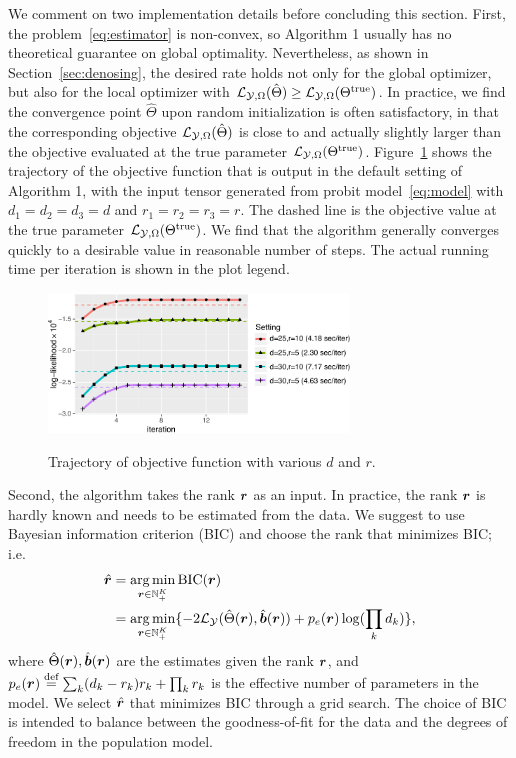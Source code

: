 \documentclass{article}
\theoremstyle{plain}
\theoremstyle{definition}
\begin{document}
We comment on two implementation details before concluding this section. First, the problem~\eqref{eq:estimator} is non-convex, so Algorithm 1 usually has no theoretical guarantee on global optimality. Nevertheless, as shown in Section~\ref{sec:denosing}, the desired rate holds not only for the global optimizer, but also for the local optimizer with $\mathcal{L}_{\mathcal{Y},\Omega}(\hat \Theta)\geq \mathcal{L}_{\mathcal{Y},\Omega}(\Theta^{\mathrm{true}})$. In practice, we find the convergence point $\hat \Theta$ upon random initialization is often satisfactory, in that the corresponding objective $\mathcal{L}_{\mathcal{Y},\Omega}(\hat \Theta)$ is close to and actually slightly larger than the objective evaluated at the true parameter $\mathcal{L}_{\mathcal{Y},\Omega}(\Theta^{\mathrm{true}})$. Figure~\ref{fig:stability} shows the trajectory of the objective function that is output in the default setting of Algorithm 1, with the input tensor generated from probit model~\eqref{eq:model} with $d_1=d_2=d_3=d$ and $r_1=r_2=r_3=r$. The dashed line is the objective value at the true parameter $\mathcal{L}_{\mathcal{Y},\Omega}(\Theta^{\mathrm{true}})$. We find that the algorithm generally converges quickly to a desirable value in reasonable number of steps. The actual running time per iteration is shown in the plot legend.

\begin{figure}[H]
\centering
\includegraphics[width=8cm]{algorithm.pdf}\label{fig:stability}
\vspace{-.2cm}
\caption{Trajectory of objective function with various $d$ and $r$.}
\vspace{-.2cm}
\end{figure}



Second, the algorithm takes the rank $\bm{r}$ as an input. In practice, the rank $\bm{r}$ is hardly known and needs to be estimated from the data. We suggest to use Bayesian information criterion (BIC) and choose the rank that minimizes BIC; i.e.
\begin{align}\label{eq:BIC}
\hat {\bm{r}}&=\operatorname*{arg\,min}_{\bm{r}\in\mathbb{N}^K_{+}} \text{BIC}(\bm{r})\\
&=\operatorname*{arg\,min}_{\bm{r}\in\mathbb{N}^K_{+}}\{-2\mathcal{L}_{\mathcal{Y}}(\hat \Theta(\bm{r}),\hat {\bm{b}}(\bm{r}))+p_e(\bm{r})\log (\prod_k d_k)\},
\end{align}
where $\hat \Theta(\bm{r}), \hat{\bm{b}}(\bm{r})$ are the estimates given the rank $\bm{r}$, and $p_e(\bm{r})\stackrel{\text{def}}{=}\sum_k (d_k-r_k)r_k+\prod_k r_k$ is the effective number of parameters in the model. We select $\hat {\bm{r}}$ that minimizes BIC through a grid search. The choice of BIC is intended to balance between the goodness-of-fit for the data and the degrees of freedom in the population model.
\end{document}

